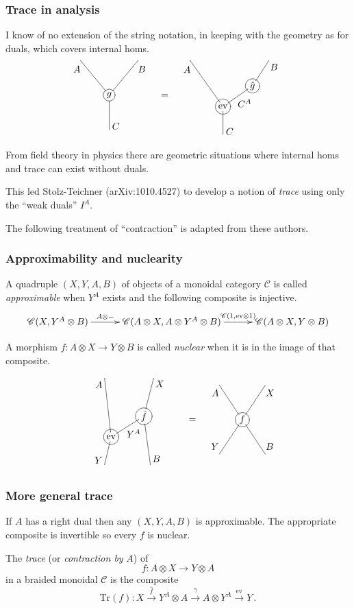 \documentclass{beamer}
\newcommand{\lra}{\longrightarrow}
\def\CC{{\mathscr C}}
\begin{document}
\begin{frame}
\frametitle{Trace in analysis}

I know of no extension of the string notation, in keeping with the geometry as for duals, which covers internal homs.
\[
\xygraph{ !{/r2.5pc/: /u3pc/::}
 [d] *+[Fo][o]{g} (
  ? - [ul]^(.9)*{A} , ? - [ur]_(.9)*{B} , ? - [d]^(.9)*{C}
 )} \quad = \quad  
 \xygraph{ !{/r2.85pc/: /u2pc/::}
 [d(1.5)] *+[Fo][o]{\mathrm{ev}} (
  ? - [uul]^(.9)*{A} 
  , ? - [ur(.9)]*+[Fo][o]{\hat{g}} _*{C^A}
     - [r(.5)u(1.1)]_(.9)*{B}
  , ? - [d(1.2)]^(.9)*{C}
 )} 
\]

From field theory in physics there are geometric situations where internal homs and trace can exist without duals.   

This led Stolz-Teichner (arXiv:1010.4527) to develop a notion of \emph{trace} using only the ``weak duals'' $I^A$.

The following treatment of ``contraction'' is adapted from these authors. 

\end{frame}
\begin{frame}
\frametitle{Approximability and nuclearity}

A quadruple $(X,Y,A,B)$ of objects of a monoidal category $\CC$ is called \emph{approximable} when $Y^A$ exists and the following composite is injective.
\[
\xymatrix @C+2mm {
\CC (X,Y^A \otimes B) \ar[r]^-{A \otimes -}   
& \CC (A \otimes X, A \otimes Y^A \otimes B)  \ar[r]^-{\CC(1,\mathrm{ev} \otimes 1)} 
& \CC (A \otimes X, Y \otimes B)
}\]

A morphism $f : A \otimes X \lra Y \otimes B$ is called \emph{nuclear} when it is in the image of that composite.

\[
\xygraph{ !{/r2.85pc/: /u3pc/::}
 [d(1.5)] *+[Fo][o]{\mathrm{ev}} (
 ? - [l(.2)u(1.7)]^(.9)*{A} , ? - [l(.2)d(.8)]_(.9)*{Y} , 
 -  [u(.6)r] *+[Fo][o]{\hat{f}}_*{Y^A} (
  ? - [r(.2)d(1.4)]^(.9)*{B}, ? - [r(.3)u(1.1)]_(.9)*{X}
 ))} \quad = \quad  
 \xygraph{ !{/r2pc/: /u3pc/::}
 [d(1)] *+[Fo][o]{f} (
 ? - [ul]^(.9)*{A} , ? - [ur]_(.9)*{X} , ? - [dl]_(.9)*{Y} , ? - [dr]^(.9)*{B}
  )} 
\]
\end{frame}
\begin{frame}
\frametitle{More general trace}

\begin{example}
If $A$ has a right dual then any $(X,Y,A,B)$ is approximable. 
The appropriate composite is invertible so every $f$ is nuclear.
\end{example}

The \emph{trace} (or \emph{contraction by} $A$) of 
\[
f : A \otimes X \lra Y \otimes A
\]
in a braided monoidal  $\CC$ is the composite
\[
\mathrm{Tr} (f) : X \stackrel{\hat f}{\lra} Y^A \otimes A \stackrel{\gamma}{\lra} A \otimes Y^A \stackrel{\mathrm{ev}}{\lra} Y\,.
\]

\end{frame}
\end{document}
